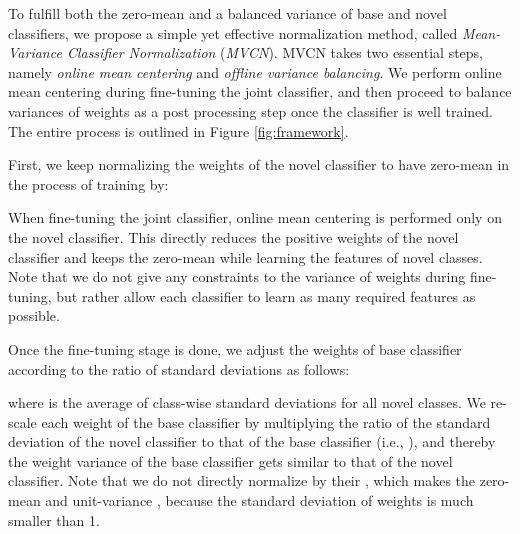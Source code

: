 To fulfill both the zero-mean and a balanced variance of base and novel classifiers, we propose a simple yet effective normalization method, called \textit{Mean-Variance Classifier Normalization} (\textit{MVCN}). MVCN takes two essential steps, namely \textit{online mean centering} and \textit{offline variance balancing}. We perform online mean centering during fine-tuning the joint classifier, and then proceed to balance variances of weights as a post processing step once the classifier is well trained. The entire process is outlined in Figure \ref{fig:framework}.


 First, we keep normalizing the weights of the novel classifier to have zero-mean in the process of training by:

When fine-tuning the joint classifier, online mean centering is performed only on the novel classifier. This directly reduces the positive weights of the novel classifier and keeps the zero-mean while learning the features of novel classes. Note that we do not give any constraints to the variance of weights during fine-tuning, but rather allow each classifier to learn as many required features as possible.








Once the fine-tuning stage is done, we adjust the weights of base classifier according to the ratio of standard deviations as follows:

where  is the average of class-wise standard deviations for all novel classes. We re-scale each weight of the base classifier by multiplying the ratio of the standard deviation of the novel classifier to that of the base classifier (i.e., ), and thereby the weight variance of the base classifier gets similar to that of the novel classifier. Note that we do not directly normalize  by their , which makes the zero-mean and unit-variance , because the standard deviation of weights is much smaller than 1.









